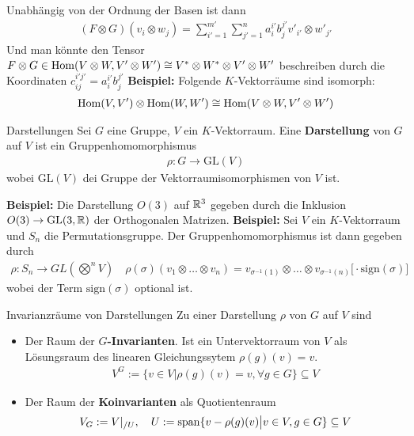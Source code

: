 Unabhängig von der Ordnung der Basen ist dann
\begin{align*}
    (F \otimes G)(v_i \otimes w_j) = \sum_{i' = 1}^{m'} \sum_{j' = 1}^{n} a_{i}^{i'} b_{j}^{j'} v'_{i'} \otimes w'_{j'}
\end{align*}
Und man könnte den Tensor $F \otimes G \in \operatorname{Hom}(V \otimes W, V' \otimes W') \cong V^* \otimes W^* \otimes V' \otimes W'$ beschreiben durch die Koordinaten $c_{ij}^{i'j'} = a_{i}^{i'}b_{j}^{j'}$
\textbf{Beispiel:} \quad Folgende $K$-Vektorräume sind isomorph:
\begin{align*}
    \operatorname{Hom}(V,V') \otimes \operatorname{Hom}(W,W') \cong \operatorname{Hom}(V \otimes W, V' \otimes W')
\end{align*}


\begin{definition}{Darstellungen}
    Sei $G$ eine Gruppe, $V$ ein $K$-Vektorraum. Eine \textbf{Darstellung} von $G$ auf $V$ ist ein Gruppenhomomorphismus
    \begin{align*}
        \rho: G \to \text{GL}(V)
    \end{align*}
    wobei $\text{GL}(V)$ dei Gruppe der Vektorraumisomorphismen von $V$ ist.
\end{definition}

\textbf{Beispiel:} Die Darstellung $O(3)$ auf $\mathbb{R}^3$ gegeben durch die Inklusion $O(3) \to \text{GL}(3,\mathbb{R})$ der Orthogonalen Matrizen.
\textbf{Beispiel:} Sei $V$ ein $K$-Vektorraum und $S_n$ die Permutationsgruppe. Der Gruppenhomomorphismus ist dann gegeben durch
\begin{align*}
    \rho: S_n \to GL(\bigotimes^n V) \quad \rho(\sigma)(v_1 \otimes \ldots \otimes v_n) = v_{\sigma^{-1}(1)} \otimes \ldots \otimes v_{\sigma^{-1}(n)} \big[\cdot \text{sign}(\sigma) \big]
\end{align*}
wobei der Term $\text{sign}(\sigma)$ optional ist.

\begin{definition}{Invarianzräume von Darstellungen}
    Zu einer Darstellung $\rho$ von $G$ auf $V$ sind
    \begin{itemize}
        \item   Der Raum der $G$\textbf{-Invarianten}. Ist ein Untervektorraum von $V$ als Lösungsraum des linearen Gleichungssytem $\rho(g)(v) = v$.
        \begin{align*}
            V^G := \{v \in V \big\vert \rho(g)(v) = v, \forall g \in G\} \subseteq V
        \end{align*}
        \item   Der Raum der \textbf{Koinvarianten} als Quotientenraum
        \begin{align*}
            V_G := V|_{/ U}, \quad U := \operatorname{span}\{v - \rho(g)(v) \big\vert v \in V, g \in G\} \subseteq V
        \end{align*}
    \end{itemize}
\end{definition}

